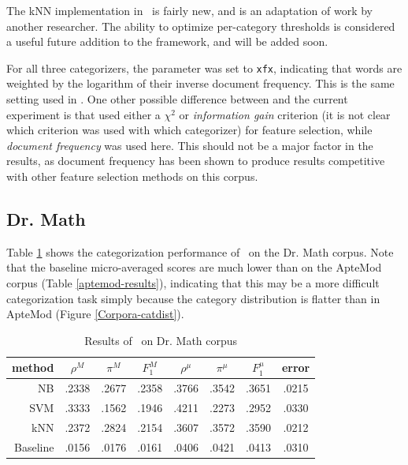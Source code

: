 The kNN implementation in \aicat\ is fairly new, and is an adaptation
of work by another researcher.  The ability to optimize per-category
thresholds is considered a useful future addition to the framework,
and will be added soon.

For all three categorizers, the  parameter was set to
\texttt{xfx}, indicating that words are weighted by the logarithm of
their inverse document frequency.  This is the same setting used in
\cite{yang:99}.  One other possible difference between \cite{yang:99}
and the current experiment is that \cite{yang:99} used either a
$\chi^2$ or \emph{information gain} criterion (it is not clear which
criterion was used with which categorizer) for feature selection,
while \emph{document frequency} was used here.  This should not be a
major factor in the results, as document frequency has been shown to
produce results competitive with other feature selection methods on
this corpus. \cite{yang:97}



\subsection{Dr. Math}

Table \ref{drmath-results} shows the categorization performance of
\aicat\ on the Dr. Math corpus.  Note that the baseline micro-averaged
scores are much lower than on the ApteMod corpus (Table
\ref{aptemod-results}), indicating that this may be a more difficult
categorization task simply because the category distribution is
flatter than in ApteMod (Figure \ref{Corpora-catdist}).


\begin{table}
\begin{center}
\begin{tabular}{|r c c c c c c c|}
\hline
method    & $\rho^M$ & $\pi^M$ & $F_1^M$ & $\rho^\mu$ & $\pi^\mu$ & $F_1^\mu$ &   error \\
\hline
NB        &   .2338  &  .2677  &  .2358  &  .3766     &  .3542    &  .3651    &  .0215  \\
SVM       &   .3333  &  .1562  &  .1946  &  .4211     &  .2273    &  .2952    &  .0330  \\
kNN       &   .2372  &  .2824  &  .2154  &  .3607     &  .3572    &  .3590    &  .0212  \\
Baseline  &   .0156  &  .0176  &  .0161  &  .0406     &  .0421    &  .0413    &  .0310  \\
\hline
\end{tabular}
\end{center}
\caption{Results of \aicat\ on Dr. Math corpus}
\label{drmath-results}
\end{table}

